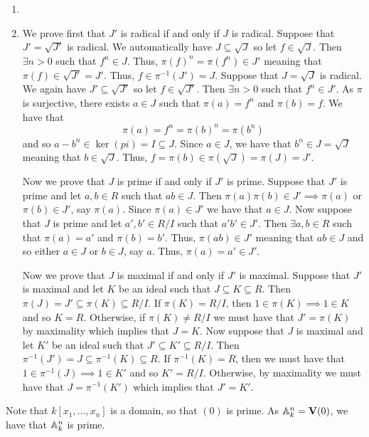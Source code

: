 \documentclass[letterpaper, 11pt, oneside]{book}
\begin{document}
\begin{sol}\label{ex:Curves_1.22}
  \begin{enumerate}[label= (\alph*)]
    \item {}
    \item We prove first that $J'$ is radical if and only if $J$ is radical.
          Suppose that $J' = \sqrt{J'}$ is radical.
          We automatically have $J \subseteq \sqrt{J}$ so let $f \in \sqrt{J}$.
          Then $\exists n > 0$ such that $f^{n} \in J$.
          Thus, $\pi(f)^{n} = \pi(f^{n}) \in J'$ meaning that $\pi(f) \in \sqrt{J'} = J'$.
          Thus, $f \in \pi^{-1}(J') = J$.
          Suppose that $J = \sqrt{J}$ is radical.
          We again have $J' \subseteq \sqrt{J'}$ so let $f \in \sqrt{J'}$.
          Then $\exists n > 0$ such that $f^{n} \in J'$.
          As $\pi$ is surjective, there exists $a \in J$ such that $\pi(a) = f^{n}$ and $\pi(b) = f$.
          We have that
          \[
            \pi(a) = f^{n} = \pi(b)^{n} = \pi(b^{n})
          \]
          and so $a - b^{n} \in \ker(pi) = I \subseteq J$.
          Since $a \in J$, we have that $b^{n} \in J = \sqrt{J}$ meaning that $b \in \sqrt{J}$.
          Thus, $f = \pi(b) \in \pi(\sqrt{J}) = \pi(J) = J'$.

          Now we prove that $J$ is prime if and only if $J'$ is prime.
          Suppose that $J'$ is prime and let $a, b \in R$ such that $ab \in J$.
          Then $\pi(a)\pi(b) \in J' \implies \pi(a)$ or $\pi(b) \in J'$, say $\pi(a)$.
          Since $\pi(a) \in J'$ we have that $a \in J$.
          Now suppose that $J$ is prime and let $a', b' \in R/I$ such that $a'b' \in J'$.
          Then $\exists a, b \in R$ such that $\pi(a) = a'$ and $\pi(b) = b'$.
          Thus, $\pi(ab) \in J'$ meaning that $ab \in J$ and so either $a \in J$ or $b \in J$, say $a$.
          Thus, $\pi(a) = a' \in J'$.

          Now we prove that $J$ is maximal if and only if $J'$ is maximal.
          Suppose that $J'$ is maximal and let $K$ be an ideal such that $J \subseteq K \subseteq R$.
          Then $\pi(J) = J' \subseteq \pi(K) \subseteq R/I$.
          If $\pi(K) = R / I$, then $1 \in \pi(K) \implies 1 \in K$ and so $K = R$.
          Otherwise, if $\pi(K) \neq R / I$ we must have that $J' = \pi(K)$ by maximality which implies that $J = K$.
          Now suppose that $J$ is maximal and let $K'$ be an ideal such that $J' \subseteq K' \subseteq R/I$.
          Then $\pi^{-1}(J') = J \subseteq \pi^{-1}(K) \subseteq R$.
          If $\pi^{-1}(K) = R$, then we must have that $1 \in \pi^{-1}(J) \implies 1 \in K'$ and so $K' = R/I$.
          Otherwise, by maximality we must have that $J = \pi^{-1}(K')$ which implies that $J' = K'$.
  \end{enumerate}
\end{sol}

\begin{sol}\label{ex:Curves_1.29}
  Note that $k[x_{1}, \ldots, x_{n}]$ is a domain, so that $(0)$ is prime.
  As $\mathbb{A}_{k}^{n} = \operatorname{\mathbf{V}}(0)$, we have that $\mathbb{A}_{k}^{n}$ is prime.
\end{sol}



\printbibliography
\end{document}

